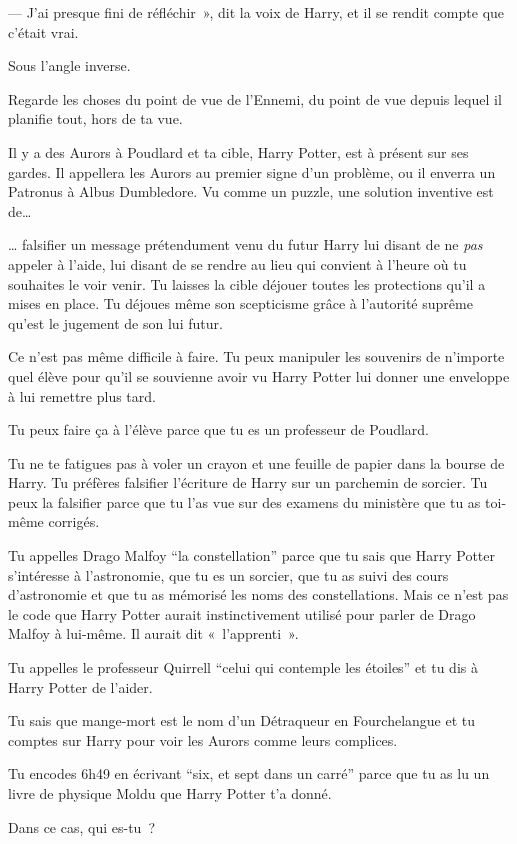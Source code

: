 --- J'ai presque fini de réfléchir~», dit la voix de Harry, et il se rendit compte que c'était vrai.

Sous l'angle inverse.

Regarde les choses du point de vue de l'Ennemi, du point de vue depuis lequel il planifie tout, hors de ta vue.

Il y a des Aurors à Poudlard et ta cible, Harry Potter, est à présent sur ses gardes.
Il appellera les Aurors au premier signe d'un problème, ou il enverra un Patronus à Albus Dumbledore.
Vu comme un puzzle, une solution inventive est de…

… falsifier un message prétendument venu du futur Harry lui disant de ne \emph{pas} appeler à l'aide, lui disant de se rendre au lieu qui convient à l'heure où tu souhaites le voir venir.
Tu laisses la cible déjouer toutes les protections qu'il a mises en place.
Tu déjoues même son scepticisme grâce à l'autorité suprême qu'est le jugement de son lui futur.

Ce n'est pas même difficile à faire.
Tu peux manipuler les souvenirs de n'importe quel élève pour qu'il se souvienne avoir vu Harry Potter lui donner une enveloppe à lui remettre plus tard.

Tu peux faire ça à l'élève parce que tu es un professeur de Poudlard.

Tu ne te fatigues pas à voler un crayon et une feuille de papier dans la bourse de Harry.
Tu préfères falsifier l'écriture de Harry sur un parchemin de sorcier.
Tu peux la falsifier parce que tu l'as vue sur des examens du ministère que tu as toi-même corrigés.

Tu appelles Drago Malfoy “la constellation” parce que tu sais que Harry Potter s'intéresse à l'astronomie, que tu es un sorcier, que tu as suivi des cours d'astronomie et que tu as mémorisé les noms des constellations.
Mais ce n'est pas le code que Harry Potter aurait instinctivement utilisé pour parler de Drago Malfoy à lui-même.
Il aurait dit «~l'apprenti~».

Tu appelles le professeur Quirrell “celui qui contemple les étoiles” et tu dis à Harry Potter de l'aider.

Tu sais que mange-mort est le nom d'un Détraqueur en Fourchelangue et tu comptes sur Harry pour voir les Aurors comme leurs complices.

Tu encodes 6h49 en écrivant “six, et sept dans un carré” parce que tu as lu un livre de physique Moldu que Harry Potter t'a donné.

Dans ce cas, qui es-tu~?

